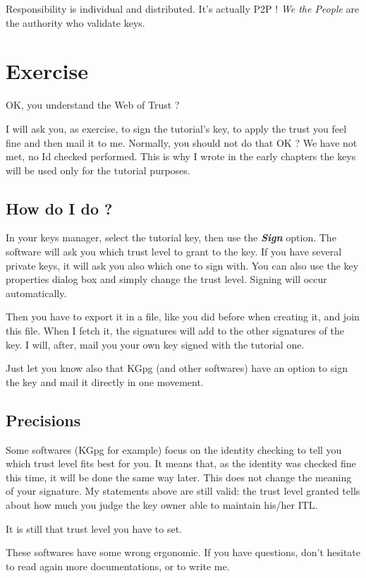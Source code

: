 Responsibility is individual and distributed. It's actually P2P ! \emph{We the People} are the authority who validate keys.

\section{Exercise}\label{exercise}

OK, you understand the Web of Trust ?

I will ask you, as exercise, to sign the tutorial's key, to apply the trust you feel fine and then mail it to me. Normally, you should not do that OK ? We have not met, no Id checked performed. This is why I wrote in the early chapters the keys will be used only for the tutorial purposes.

\subsection{How do I do ?}\label{how-do-i-do}

In your keys manager, select the tutorial key, then use the \textbf{\emph{Sign}} option. The software will ask you which trust level to grant to the key. If you have several private keys, it will ask you also which one to sign with. You can also use the key properties dialog box and simply change the trust level. Signing will occur automatically.

Then you have to export it in a file, like you did before when creating it, and join this file. When I fetch it, the signatures will add to the
other signatures of the key. I will, after, mail you your own key signed with the tutorial one.

Just let you know also that KGpg (and other softwares) have an option to sign the key and mail it directly in one movement.

\subsection{Precisions}\label{precisions}

Some softwares (KGpg for example) focus on the identity checking to tell you which trust level fits best for you. It means that, as the identity
was checked fine this time, it will be done the same way later. This does not change the meaning of your signature. My statements above are still valid: the trust level granted tells about how much you judge the key owner able to maintain his/her ITL.

It is still that trust level you have to set.

These softwares have some wrong ergonomic. If you have questions, don't hesitate to read again more documentations, or to write me.